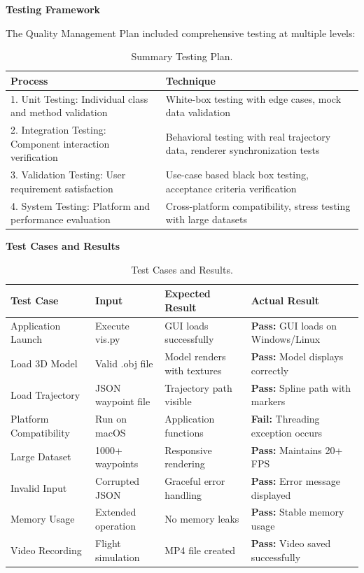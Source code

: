 \documentclass[11pt,a4paper]{article}
\begin{document}
\textbf{Testing Framework}

The Quality Management Plan included comprehensive testing at multiple levels:

\begin{table}[ht]
  \centering
  \caption{Summary Testing Plan.}
  \begin{tabular}{|p{6cm}|p{8cm}|}
    \hline
    \textbf{Process} & \textbf{Technique} \\
    \hline
    1. Unit Testing: Individual class and method validation & White-box testing with edge cases, mock data validation \\
    \hline
    2. Integration Testing: Component interaction verification & Behavioral testing with real trajectory data, renderer synchronization tests \\
    \hline
    3. Validation Testing: User requirement satisfaction & Use-case based black box testing, acceptance criteria verification \\
    \hline
    4. System Testing: Platform and performance evaluation & Cross-platform compatibility, stress testing with large datasets \\
    \hline
  \end{tabular}
  \label{tab:test-plan}
\end{table}

\textbf{Test Cases and Results}

\begin{table}[ht]
  \centering
  \caption{Test Cases and Results.}
  \begin{tabular}{|p{3cm}|p{3cm}|p{3cm}|p{4cm}|}
    \hline
    \textbf{Test Case} & \textbf{Input} & \textbf{Expected Result} & \textbf{Actual Result} \\
    \hline
    Application Launch & Execute vis.py & GUI loads successfully & \textbf{Pass:} GUI loads on Windows/Linux \\
    \hline
    Load 3D Model & Valid .obj file & Model renders with textures & \textbf{Pass:} Model displays correctly \\
    \hline
    Load Trajectory & JSON waypoint file & Trajectory path visible & \textbf{Pass:} Spline path with markers \\
    \hline
    Platform Compatibility & Run on macOS & Application functions & \textbf{Fail:} Threading exception occurs \\
    \hline
    Large Dataset & 1000+ waypoints & Responsive rendering & \textbf{Pass:} Maintains 20+ FPS \\
    \hline
    Invalid Input & Corrupted JSON & Graceful error handling & \textbf{Pass:} Error message displayed \\
    \hline
    Memory Usage & Extended operation & No memory leaks & \textbf{Pass:} Stable memory usage \\
    \hline
    Video Recording & Flight simulation & MP4 file created & \textbf{Pass:} Video saved successfully \\
    \hline
  \end{tabular}
  \label{tab:tests}
\end{table}
\end{document}
